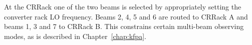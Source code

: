 At the \gls{CRRack} one of the two beams is selected by appropriately setting the
converter rack LO frequency.  Beams 2, 4, 5 and 6 are routed to \gls{CRRack} A and
beams 1, 3 and 7  to \gls{CRRack} B.  This constrains certain multi-beam observing
modes, as is described in Chapter~\ref{chap:kfpa}.





